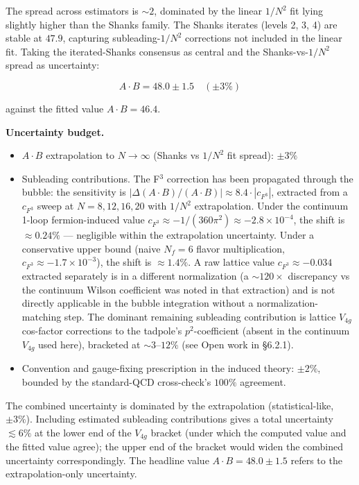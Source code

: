 \documentclass[
]{article}
\providecommand{\tightlist}{%
  \setlength{\itemsep}{0pt}\setlength{\parskip}{0pt}}
\begin{document}
The spread across estimators is \(\sim 2\), dominated by the linear
\(1/N^2\) fit lying slightly higher than the Shanks family. The Shanks
iterates (levels 2, 3, 4) are stable at \(47.9\), capturing
subleading-\(1/N^2\) corrections not included in the linear fit. Taking
the iterated-Shanks consensus as central and the Shanks-vs-\(1/N^2\)
spread as uncertainty:

\[A \cdot B = 48.0 \pm 1.5 \quad (\pm 3\%)\]

against the fitted value \(A \cdot B = 46.4\).

\textbf{Uncertainty budget.}

\begin{itemize}
\tightlist
\item
  \(A \cdot B\) extrapolation to \(N \to \infty\) (Shanks vs \(1/N^2\)
  fit spread): \(\pm 3\%\)
\item
  Subleading contributions. The F\(^3\) correction has been propagated
  through the bubble: the sensitivity is
  \(|\Delta(A \cdot B)/(A \cdot B)| \approx 8.4 \cdot |c_{F^3}|\),
  extracted from a \(c_{F^3}\) sweep at \(N = 8, 12, 16, 20\) with
  \(1/N^2\) extrapolation. Under the continuum 1-loop fermion-induced
  value \(c_{F^3} \approx -1/(360\pi^2) \approx -2.8 \times 10^{-4}\),
  the shift is \(\approx 0.24\%\) --- negligible within the
  extrapolation uncertainty. Under a conservative upper bound (naive
  \(N_f = 6\) flavor multiplication,
  \(c_{F^3} \approx -1.7 \times 10^{-3}\)), the shift is
  \(\approx 1.4\%\). A raw lattice value \(c_{F^3} \approx -0.034\)
  extracted separately is in a different normalization (a
  \(\sim 120\times\) discrepancy vs the continuum Wilson coefficient was
  noted in that extraction) and is not directly applicable in the bubble
  integration without a normalization-matching step. The dominant
  remaining subleading contribution is lattice \(V_{4g}\) cos-factor
  corrections to the tadpole's \(p^2\)-coefficient (absent in the
  continuum \(V_{4g}\) used here), bracketed at \(\sim 3\)--\(12\%\)
  (see Open work in §6.2.1).
\item
  Convention and gauge-fixing prescription in the induced theory:
  \(\pm 2\%\), bounded by the standard-QCD cross-check's \(100\%\)
  agreement.
\end{itemize}

The combined uncertainty is dominated by the extrapolation
(statistical-like, \(\pm 3\%\)). Including estimated subleading
contributions gives a total uncertainty \(\lesssim 6\%\) at the lower
end of the \(V_{4g}\) bracket (under which the computed value and the
fitted value agree); the upper end of the bracket would widen the
combined uncertainty correspondingly. The headline value
\(A \cdot B = 48.0 \pm 1.5\) refers to the extrapolation-only
uncertainty.
\end{document}
